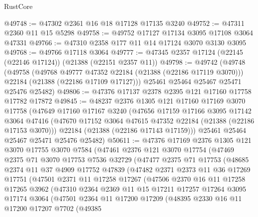 \begin{lexlean}{RustCore}
\begin{coremodule}
@49748 := @47302 @2361 @16 @18 @17128 @17135 @3240
@49752 := @47311 @2360 @11 @15 @5298
@49758 := @49752 @17127 @17134 @3095 @17108 @3064 @47331
@49766 := @47310 @2358 @177 @11 @14 @17124 @3070 @3130 @3095
@49768 := @49766 @17118 @3064
@49777 := @47345 @2357 @17124 (@22145 (@22146 @17124)) (@21388 (@22151 @2357 @11))
@49798 := @49742
    (@49748
      (@49758
        (@49768 @49777 @47352 @22184 (@21388 (@22186 @17119 @3070)))
        @22184
        (@21388 (@22186 @17109 @17127)))
      @25461
      @25464
      @25467
      @25471
      @25476
      @25482)
@49806 := @47376 @17137 @2378 @2395 @121 @17160 @17758 @17782 @17872
@49845 := @48237
    @2376
    @1305
    @121
    @17160
    @17169
    @3070
    @17758
    (@47649
      @17160
      @17167
      @3240
      (@47656
        @17159
        @17166
        @3095
        @17142
        @3064
        @47416
        (@47670 @17152 @3064 @47615 @47352 @22184 (@21388 (@22186 @17153 @3070)))
        @22184
        (@21388 (@22186 @17143 @17159)))
      @25461
      @25464
      @25467
      @25471
      @25476
      @25482)
@50611 := @47376
    @17169
    @2376
    @1305
    @121
    @3070
    @17755
    @3070
    @7584
    (@47461
      @2376
      @121
      @3070
      @17754
      (@47469
        @2375
        @71
        @3070
        @17753
        @7536
        @32729
        (@47477
          @2375
          @71
          @17753
          (@48685
            @2374
            @11
            @37
            @4909
            @17752
            @47839
            (@47482
              @2371
              @2373
              @11
              @36
              @17269
              @17751
              (@47501
                @2371
                @11
                @17258
                @17267
                (@47506
                  @2370
                  @16
                  @11
                  @17258
                  @17265
                  @3962
                  (@47310
                    @2364
                    @2369
                    @11
                    @15
                    @17211
                    @17257
                    @17264
                    @3095
                    @17174
                    @3064
                    (@47501
                      @2364
                      @11
                      @17200
                      @17209
                      (@48395
                        @2330
                        @16
                        @11
                        @17200
                        @17207
                        @7702
                        (@49385

\end{coremodule}
\end{lexlean}
